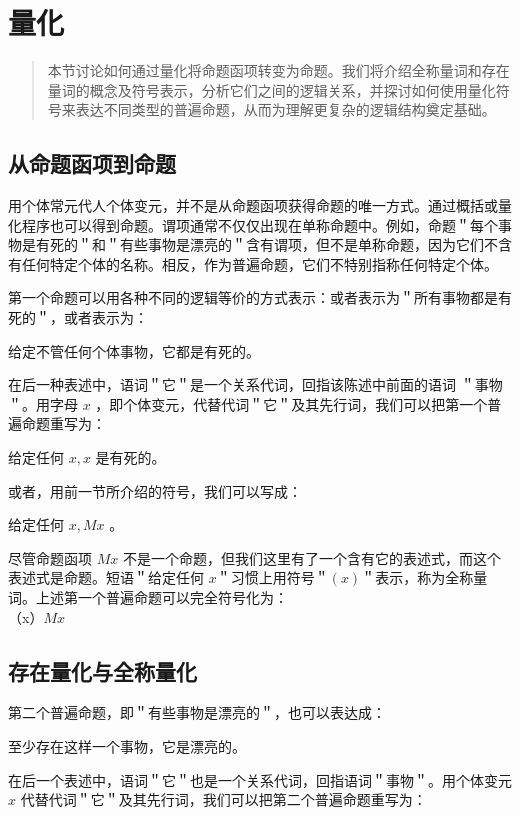 \section{量化}

\begin{quotation}
本节讨论如何通过量化将命题函项转变为命题。我们将介绍全称量词和存在量词的概念及符号表示，分析它们之间的逻辑关系，并探讨如何使用量化符号来表达不同类型的普遍命题，从而为理解更复杂的逻辑结构奠定基础。
\end{quotation}

\subsection{从命题函项到命题}

用个体常元代人个体变元，并不是从命题函项获得命题的唯一方式。通过概括或量化程序也可以得到命题。谓项通常不仅仅出现在单称命题中。例如，命题＂每个事物是有死的＂和＂有些事物是漂亮的＂含有谓项，但不是单称命题，因为它们不含有任何特定个体的名称。相反，作为普遍命题，它们不特别指称任何特定个体。

第一个命题可以用各种不同的逻辑等价的方式表示：或者表示为＂所有事物都是有死的＂，或者表示为：

给定不管任何个体事物，它都是有死的。

在后一种表述中，语词＂它＂是一个关系代词，回指该陈述中前面的语词 ＂事物＂。用字母 $x$ ，即个体变元，代替代词＂它＂及其先行词，我们可以把第一个普遍命题重写为：

给定任何 $x, x$ 是有死的。

或者，用前一节所介绍的符号，我们可以写成：

给定任何 $x, M x$ 。

尽管命题函项 $M x$ 不是一个命题，但我们这里有了一个含有它的表述式，而这个表述式是命题。短语＂给定任何 $x$＂习惯上用符号＂$(x)$＂表示，称为全称量词。上述第一个普遍命题可以完全符号化为：\\
（x）$M x$

\subsection{存在量化与全称量化}

第二个普遍命题，即＂有些事物是漂亮的＂，也可以表达成：

至少存在这样一个事物，它是漂亮的。

在后一个表述中，语词＂它＂也是一个关系代词，回指语词＂事物＂。用个体变元 $x$ 代替代词＂它＂及其先行词，我们可以把第二个普遍命题重写为：

